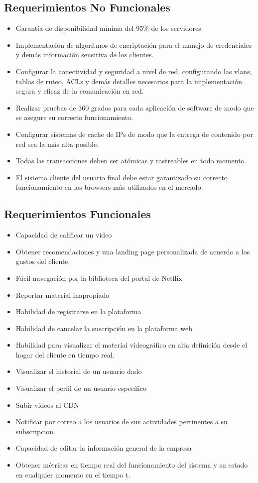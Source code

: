 \documentclass{article}
\begin{document}
\subsection{Requerimientos No Funcionales}
\begin{itemize}
	\item Garantía de disponibilidad mínima del 95\% de los servidores
	\item Implementación de algoritmos de encriptación para el
		manejo de credenciales y demás información sensitiva de los
		clientes.
  \item Configurar la conectividad y seguridad a nivel de red, configurando
          las vlans, tablas de ruteo, ACLs y demás detalles necesarios para
                la implementación segura y eficaz de la comunicación en red.
	\item Realizar pruebas de 360 grados para cada aplicación de software de
          modo que se asegure su correcto funcionamiento.
	\item Configurar sistemas de cache de IPs de modo que la entrega 
          de contenido por red sea la más alta posible.
	\item Todas las transacciones deben ser atómicas y rastreables
          en todo momento.
	\item El sistema cliente del usuario final debe estar 
		garantizado su correcto funcionamiento en los browsers más
		utilizados en el mercado.
\end{itemize}

\subsection{Requerimientos Funcionales}
\begin{itemize}
	\item Capacidad de calificar un video
	\item Obtener recomendaciones y una landing page personalizada
		de acuerdo a los gustos del cliente.
	\item Fácil navegación por la biblioteca del portal de Netflix
  \item Reportar material inapropiado
  \item Habilidad de registrarse en la plataforma
  \item Habilidad de cancelar la suscripción en la plataforma web
	\item Habilidad para visualizar el material videográfico en alta
		definición desde el hogar del cliente en tiempo real.
	\item Visualizar el historial de un usuario dado
  \item Visualizar el perfil de un usuario específico
	\item Subir videos al CDN
	\item Notificar por correo  a los usuarios de sus 
		actividades pertinentes a su subscripcion.
	\item Capacidad de editar la información general de la empresa
	\item Obtener métricas en tiempo real del funcionamiento del
		sistema y su estado en cualquier momento en el tiempo t.
\end{itemize}
\end{document}
